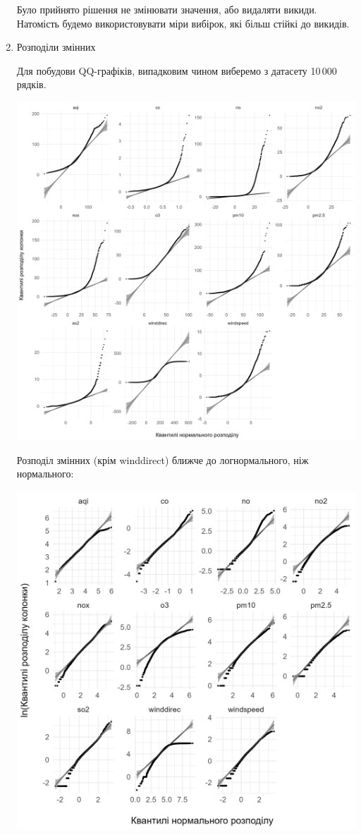 \documentclass{article}
\begin{document}
\begin{enumerate}
    Було прийнято рішення не змінювати значення, або видаляти викиди. Натомість будемо
    використовувати міри вибірок, які більш стійкі до викидів. 

    \pagebreak

    \item Розподіли змінних

    Для побудови QQ-графіків, випадковим чином виберемо з датасету 10\,000 рядків.

    \includegraphics[width=5.5in]{plots/qq_tidy/qq.png}

    \pagebreak
    
    Розподіл змінних (крім winddirect) ближче до логнормального, ніж нормального:

    \includegraphics[width=6in]{plots/qq_tidy/qq-log.png}
    

\end{enumerate}
\end{document}

